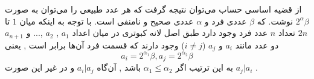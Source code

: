 \documentclass[12pt,onecolumn,a4paper]{article}
\begin{document}
    

    
    از قضیه اساسی حساب می‌توان نتیجه گرفت که هر عدد طبیعی را می‌توان به صورت
    $2^{\alpha}{\beta}$
    نوشت.
    که
    $\beta$ 
     عددی فرد و
     $\alpha$ 
     عددی صحیح و نامنفی است.
    با توجه به اینکه میان 
    $1$
    تا
    $2n$
    تعداد 
    $n$
    عدد فرد وجود دارد طبق اصل لانه کبوتری در میان اعداد
    $a_1$
    ,
    $a_2$
    ,...
    و
    $a_{n+1}$
    دو عدد مانند
    $a_i$
    و
    $a_j$
    ($i\neq j$)
    وجود دارند که قسمت فرد آن‌ها برابر است
    ,
    یعنی
    $$a_i=2^{\alpha_1}\beta,a_j=2^{\alpha_2}\beta$$
    به این ترتیب اگر
    $\alpha_1 \leq \alpha_2$
    باشد
    ,
    آن‌گاه
    $a_i|a_j$
    و در غیر این صورت
    $a_j|a_i$
    .

			
\end{document}
